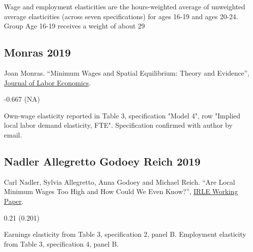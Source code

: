 \vspace{0.7em}

 Wage and employment elasticities are the hours-weighted average of unweighted average elasticities (across seven specifications) for ages 16-19 and ages 20-24. Group Age 16-19 receives a weight of about 29%

\subsection*{Monras 2019}
\vspace{-0.7em}

\noindent Joan Monras. ``Minimum Wages and Spatial Equilibrium: Theory and Evidence'', \href{https://doi.org/10.1086/702650}{Journal of Labor Economics}.

\vspace{0.7em}

 -0.667 (NA)

\vspace{0.7em}

 Own-wage elasticity reported in Table 3, specification "Model 4", row "Implied local labor demand elasticity, FTE". Specification confirmed with author by email.

\subsection*{Nadler Allegretto Godoey Reich 2019}
\vspace{-0.7em}

\noindent Carl Nadler, Sylvia Allegretto, Anna Godoey and Michael Reich. ``Are Local Minimum Wages Too High and How Could We Even Know?'', \href{http://irle.berkeley.edu/files/2019/04/Are-Local-Minimum-Wages-Too-High.pdf}{IRLE Working Paper}.

\vspace{0.7em}

 0.21 (0.201)

\vspace{0.7em}

 Earnings elasticity from Table 3, specification 2, panel B. Employment elasticity from Table 3, specification 4, panel B.


